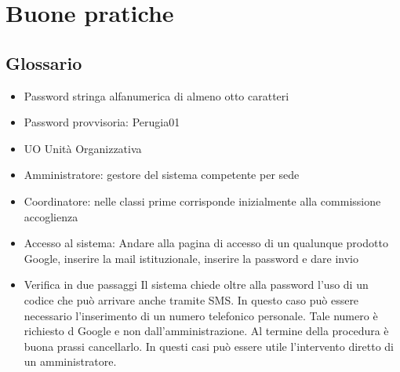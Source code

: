 \chapter{Buone pratiche}
\section{Glossario}
\begin{itemize}
	\item Password stringa alfanumerica di almeno otto caratteri
	\item Password provvisoria: Perugia01
	\item UO Unità Organizzativa
	\item Amministratore: gestore del sistema competente per sede
	\item Coordinatore: nelle classi prime corrisponde inizialmente alla commissione 
	accoglienza
	\item Accesso al sistema: Andare alla pagina di accesso di un qualunque 
	prodotto Google, inserire la mail istituzionale, inserire la password e 
	dare invio
	\item Verifica in due passaggi Il sistema chiede oltre alla password l'uso 
	di un codice che può arrivare anche tramite SMS. In questo caso può essere necessario
	l'inserimento di un numero telefonico personale. Tale numero è richiesto d Google e 
	non dall'amministrazione. Al termine della procedura è buona prassi 
	cancellarlo. In questi casi può essere utile l'intervento diretto di un 
	amministratore.
\end{itemize}

